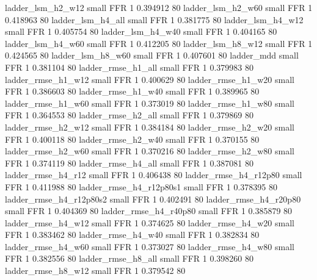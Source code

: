        ladder_lsm_h2_w12      small      FFR                 1 0.394912 80
       ladder_lsm_h2_w60      small      FFR                 1 0.418963 80
       ladder_lsm_h4_all      small      FFR                 1 0.381775 80
       ladder_lsm_h4_w12      small      FFR                 1 0.405754 80
       ladder_lsm_h4_w40      small      FFR                 1 0.404165 80
       ladder_lsm_h4_w60      small      FFR                 1 0.412205 80
       ladder_lsm_h8_w12      small      FFR                 1 0.424565 80
       ladder_lsm_h8_w60      small      FFR                 1 0.407601 80
              ladder_mdd      small      FFR                 1 0.381104 80
      ladder_rmse_h1_all      small      FFR                 1 0.379983 80
      ladder_rmse_h1_w12      small      FFR                 1 0.400629 80
      ladder_rmse_h1_w20      small      FFR                 1 0.386603 80
      ladder_rmse_h1_w40      small      FFR                 1 0.389965 80
      ladder_rmse_h1_w60      small      FFR                 1 0.373019 80
      ladder_rmse_h1_w80      small      FFR                 1 0.364553 80
      ladder_rmse_h2_all      small      FFR                 1 0.379869 80
      ladder_rmse_h2_w12      small      FFR                 1 0.384184 80
      ladder_rmse_h2_w20      small      FFR                 1 0.400118 80
      ladder_rmse_h2_w40      small      FFR                 1 0.370155 80
      ladder_rmse_h2_w60      small      FFR                 1 0.370216 80
      ladder_rmse_h2_w80      small      FFR                 1 0.374119 80
      ladder_rmse_h4_all      small      FFR                 1 0.387081 80
      ladder_rmse_h4_r12      small      FFR                 1 0.406438 80
   ladder_rmse_h4_r12p80      small      FFR                 1 0.411988 80
 ladder_rmse_h4_r12p80s1      small      FFR                 1 0.378395 80
 ladder_rmse_h4_r12p80s2      small      FFR                 1 0.402491 80
   ladder_rmse_h4_r20p80      small      FFR                 1 0.404369 80
   ladder_rmse_h4_r40p80      small      FFR                 1 0.385879 80
      ladder_rmse_h4_w12      small      FFR                 1 0.374625 80
      ladder_rmse_h4_w20      small      FFR                 1 0.383462 80
      ladder_rmse_h4_w40      small      FFR                 1 0.382834 80
      ladder_rmse_h4_w60      small      FFR                 1 0.373027 80
      ladder_rmse_h4_w80      small      FFR                 1 0.382556 80
      ladder_rmse_h8_all      small      FFR                 1 0.398260 80
      ladder_rmse_h8_w12      small      FFR                 1 0.379542 80
